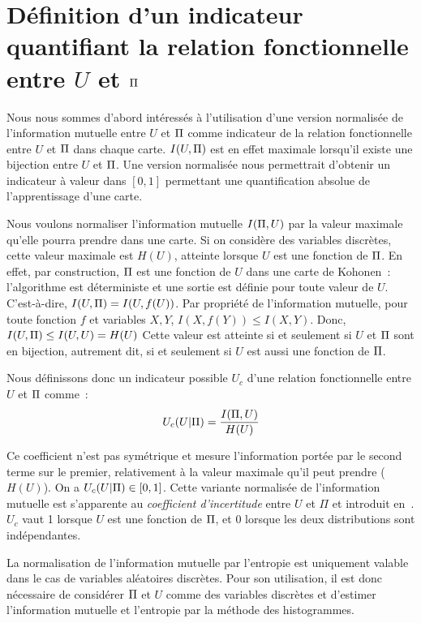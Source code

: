 \documentclass[../main]{subfiles}
\begin{document}
\section{Définition d'un indicateur quantifiant la relation fonctionnelle entre $U$ et $\Pi$}

Nous nous sommes d'abord intéressés à l'utilisation d'une version normalisée de l'information mutuelle entre $U$ et $\Pi$ comme indicateur de la relation fonctionnelle entre $U$ et $\Pi$ dans chaque carte.
$I(U,\Pi)$ est en effet maximale lorsqu'il existe une bijection entre $U$ et $\Pi$. Une version normalisée nous permettrait d'obtenir un indicateur à valeur dans $[0,1]$ permettant une quantification absolue de l'apprentissage d'une carte.

Nous voulons normaliser l'information mutuelle $I(\Pi,U)$  par la valeur maximale qu'elle pourra prendre dans une carte. Si on considère des variables discrètes, cette valeur maximale est $H(U)$, atteinte lorsque $U$ est une fonction de $\Pi$.
En effet, par construction, $\Pi$ est une fonction de $U$ dans une carte de Kohonen~: l'algorithme est déterministe et une sortie est définie pour toute valeur de $U$. C'est-à-dire, $I(U,\Pi) = I (U, f(U))$.
Par propriété de l'information mutuelle, pour toute fonction $f$ et variables $X,Y$, $I(X,f(Y)) \leq I(X,Y) $. 
Donc, $I(U,\Pi) \leq I(U,U) = H(U)$
Cette valeur est atteinte si et seulement si $U$ et $\Pi$ sont en bijection, autrement dit, si et seulement si $U$ est aussi une fonction de $\Pi$.

Nous définissons donc un indicateur possible $U_c$ d'une relation fonctionnelle entre $U$ et $\Pi$ comme~:
\begin{equation}
U_c(U|\Pi) = \frac{I(\Pi,U)}{H(U)}
\end{equation}

Ce coefficient n'est pas symétrique et mesure l'information portée par le second terme sur le premier, relativement à la valeur maximale qu'il peut prendre ($H(U)$). 
On a $U_c(U|\Pi) \in [0,1]$. 
Cette variante normalisée de l'information mutuelle est s'apparente au \emph{coefficient d'incertitude} entre $U$ et $\Pi$ et introduit en~\cite{Theil1961EconomicFA}.
$U_c$ vaut 1 lorsque $U$ est une fonction de $\Pi$, et $0$ lorsque les deux distributions sont indépendantes.

La normalisation de l'information mutuelle par l'entropie est uniquement valable dans le cas de variables aléatoires discrètes. 
Pour son utilisation, il est donc nécessaire de considérer $\Pi$ et $U$ comme des variables discrètes et d'estimer l'information mutuelle et l'entropie par la méthode des histogrammes.
\end{document}
